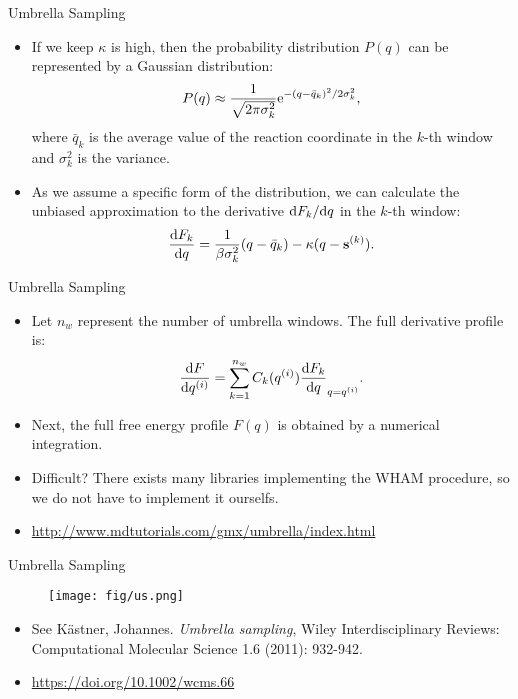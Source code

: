 \documentclass[10pt]{beamer}
\begin{document}
\begin{frame}{Umbrella Sampling}
\begin{itemize}
\setlength\itemsep{1em}
  \item If we keep $\kappa$ is high, then the probability distribution $P(q)$ can be represented by a Gaussian distribution:
  \begin{equation}
    P(q) \approx \frac{1}{\sqrt{2\pi\sigma_k^2}} \mathrm{e}^{-(q-\bar{q}_k)^2/2\sigma^2_k},
  \end{equation}
  where $\bar{q}_k$ is the average value of the reaction coordinate in the $k$-th window and $\sigma_k^2$ is the variance.
  \item As we assume a specific form of the distribution, we can calculate the unbiased approximation to the derivative $\mathrm{d} F_k/\mathrm{d} q$ in the $k$-th window:
  \begin{equation}
    \frac{\mathrm{d} F_k}{\mathrm{d} q} = \frac{1}{\beta \sigma_k^2} (q-\bar{q}_k) - \kappa(q-{\bf s}^{(k)}).
  \end{equation}
\end{itemize}
\end{frame}

\begin{frame}{Umbrella Sampling}
\begin{itemize}
\setlength\itemsep{1em}
  \item Let $n_w$ represent the number of umbrella windows. The full derivative profile is:
  \begin{equation}
    \frac{\mathrm{d} F}{\mathrm{d} q^{(i)}} = \sum_{k=1}^{n_w} C_k(q^{(i)}) {\frac{\mathrm{d} F_k}{\mathrm{d} q}}_{q=q^{(i)}}.
  \end{equation}
  \item Next, the full free energy profile $F(q)$ is obtained by a numerical integration.
  \item Difficult? There exists many libraries implementing the WHAM procedure, so we do not have to implement it ourselfs.
  \item \url{http://www.mdtutorials.com/gmx/umbrella/index.html}
\end{itemize}
\end{frame}

\begin{frame}{Umbrella Sampling}
\begin{figure}
  \texttt{[image: fig/us.png]}
\end{figure}
\begin{itemize}
\setlength\itemsep{1em}
  \item See K\"astner, Johannes. \textit{Umbrella sampling}, Wiley Interdisciplinary Reviews: Computational Molecular Science 1.6 (2011): 932-942.
  \item \url{https://doi.org/10.1002/wcms.66}
\end{itemize}
\end{frame}
\end{document}
